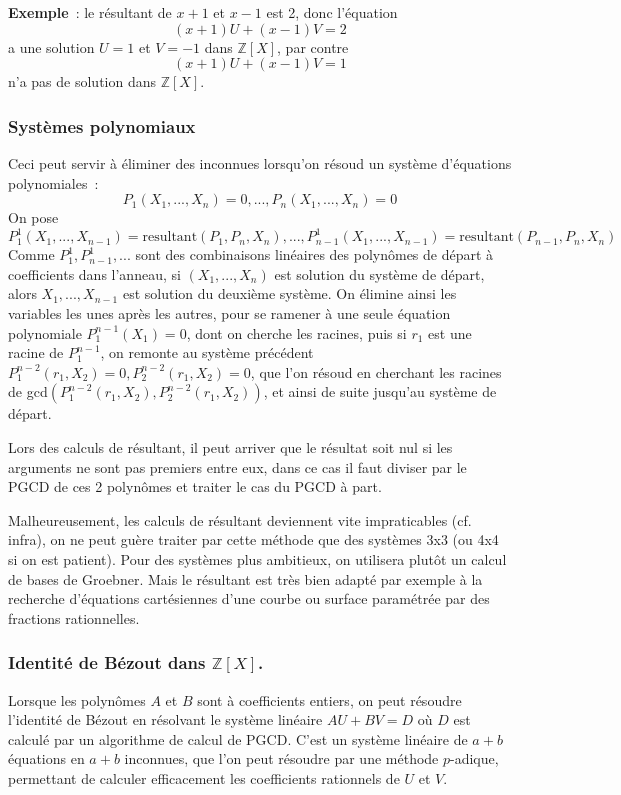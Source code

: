 \documentclass[a4paper,11pt]{article}
\newcommand{\Z}{{\mathbb{Z}}}
\begin{document}
\begin{giacjshere}
{\bf Exemple}~: le r\'esultant de $x+1$ et $x-1$ est 2, donc l'\'equation
$$ (x+1)U+(x-1)V=2$$ a une solution $U=1$ et $V=-1$ dans $\Z[X]$,
par contre $$ (x+1)U+(x-1)V=1$$ n'a pas de solution dans $\Z[X]$.

\subsubsection{Syst\`emes polynomiaux}
Ceci peut servir \`a \'eliminer des inconnues lorsqu'on r\'esoud un
syst\`eme d'\'equations polynomiales~:
$$ P_1(X_1,...,X_n)=0, ..., P_n(X_1,...,X_n)=0$$
On pose 
$$P^1_1(X_1,...,X_{n-1})=\mbox{resultant}(P_1,P_n,X_n), ..., 
P^1_{n-1}(X_1,...,X_{n-1})=\mbox{resultant}(P_{n-1},P_n,X_n)
$$
Comme $P^1_1, P^1_{n-1}, ...$ sont des combinaisons lin\'eaires des
polyn\^omes de d\'epart \`a coefficients dans l'anneau, si
$(X_1,...,X_n)$
est solution du syst\`eme de d\'epart, alors $X_1,...,X_{n-1}$
est solution du deuxi\`eme syst\`eme.
On \'elimine ainsi les variables les unes apr\`es les autres,
pour se ramener \`a une seule \'equation polynomiale $P^{n-1}_1(X_1)=0$, dont on
cherche les racines, puis si $r_1$ est une racine de $P^{n-1}_1$, on
remonte au syst\`eme pr\'ec\'edent $P^{n-2}_1(r_1,X_2)=0,
P^{n-2}_2(r_1,X_2)=0$, que l'on r\'esoud en cherchant
les racines de gcd$(P^{n-2}_1(r_1,X_2),P^{n-2}_2(r_1,X_2))$, et ainsi
de suite jusqu'au syst\`eme de d\'epart.

Lors des calculs de r\'esultant, il peut arriver que le r\'esultat
soit nul si les arguments ne sont pas premiers entre eux, dans
ce cas il faut diviser par le PGCD de ces 2 polyn\^omes et traiter le cas
du PGCD \`a part.

Malheureusement, les calculs de r\'esultant deviennent vite
impraticables (cf. infra), on ne peut gu\`ere traiter par cette m\'ethode
que des syst\`emes 3x3 (ou 4x4 si on est patient). Pour
des syst\`emes plus ambitieux, on utilisera plut\^ot un
calcul de bases de Groebner. Mais le r\'esultant est tr\`es bien
adapt\'e par exemple \`a la recherche d'\'equations cart\'esiennes
d'une courbe ou surface param\'etr\'ee par des fractions rationnelles.

\subsubsection{Identit\'e de B\'ezout dans $\Z[X]$.}
Lorsque les polyn\^omes $A$ et $B$ sont \`a coefficients entiers,
on peut r\'esoudre l'identit\'e de B\'ezout en r\'esolvant le
syst\`eme lin\'eaire $AU+BV=D$ o\`u $D$ est calcul\'e par
un algorithme de calcul de PGCD. C'est un syst\`eme lin\'eaire
de $a+b$ \'equations en $a+b$ inconnues, que l'on peut r\'esoudre
par une m\'ethode $p$-adique, permettant de calculer efficacement
les coefficients rationnels de $U$ et $V$.


\end{giacjshere}
\end{document}
